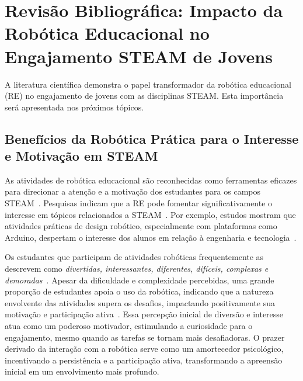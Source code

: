 \documentclass[%
  a4paper,%
  12pt,%
  fleqn,%
  english,%
  brazilian,%
]{article}
\begin{document}


\section{Revisão Bibliográfica: Impacto da Robótica Educacional no Engajamento STEAM de Jovens}
A literatura científica demonstra o papel transformador da robótica educacional (RE) no engajamento de jovens com as disciplinas STEAM. Esta importância será apresentada nos próximos tópicos.

\subsection{Benefícios da Robótica Prática para o Interesse e Motivação em STEAM}
As atividades de robótica educacional são reconhecidas como ferramentas eficazes para direcionar a atenção e a motivação dos estudantes para os campos STEAM~\cite{cheung2024SummerLibraries}. Pesquisas indicam que a RE pode fomentar significativamente o interesse em tópicos relacionados a STEAM~\cite{ross2024BeyondExhibits}. Por exemplo, estudos mostram que atividades práticas de design robótico, especialmente com plataformas como Arduino, despertam o interesse dos alunos em relação à engenharia e tecnologia~\cite{cheung2024SummerLibraries}.

Os estudantes que participam de atividades robóticas frequentemente as descrevem como \emph{divertidas, interessantes, diferentes, difíceis, complexas e demoradas}~\cite{cheung2024SummerLibraries}. Apesar da dificuldade e complexidade percebidas, uma grande proporção de estudantes apoia o uso da robótica, indicando que a natureza envolvente das atividades supera os desafios, impactando positivamente sua motivação e participação ativa~\cite{cheung2024SummerLibraries}. Essa percepção inicial de diversão e interesse atua como um poderoso motivador, estimulando a curiosidade para o engajamento, mesmo quando as tarefas se tornam mais desafiadoras. O prazer derivado da interação com a robótica serve como um amortecedor psicológico, incentivando a persistência e a participação ativa, transformando a apreensão inicial em um envolvimento mais profundo.
\end{document}
